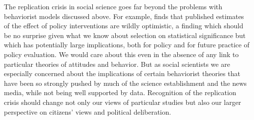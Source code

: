 \documentclass[11pt,letterpaper]{article}
\begin{document}
The replication crisis in social science goes far beyond the problems with
behaviorist models discussed above. For example, \citet{vivalt2020} finds that
published estimates of the effect of policy interventions are wildly optimistic,
a finding which should be no surprise given what we know about selection on
statistical significance \citep[see e.g.,][]{button2013} but which has
potentially large implications, both for policy and for future practice of
policy evaluation. We would care about this even in the absence of any link to
particular theories of attitudes and behavior. But as social scientists we are
especially concerned about the implications of certain behaviorist theories that
have been so strongly pushed by much of the science establishment and the news
media, while not being well supported by data. Recognition of the replication
crisis should change not only our views of particular studies but also our
larger perspective on citizens' views and political deliberation.



\end{document}
